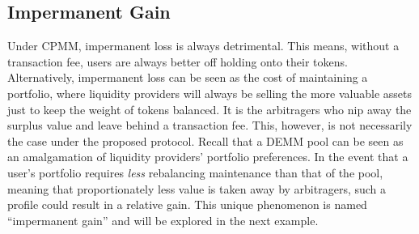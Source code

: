 \documentclass[12pt,a4paper]{article}
\begin{document}
\subsection{Impermanent Gain}

Under CPMM, impermanent loss is always detrimental. This means, without a transaction fee, users are always better off holding onto their tokens. Alternatively, impermanent loss can be seen as the cost of maintaining a portfolio, where liquidity providers will always be selling the more valuable assets just to keep the weight of tokens balanced. It is the arbitragers who nip away the surplus value and leave behind a transaction fee. This, however, is not necessarily the case under the proposed protocol. Recall that a DEMM pool can be seen as an amalgamation of liquidity providers' portfolio preferences. In the event that a user's portfolio requires \emph{less} rebalancing maintenance than that of the pool, meaning that proportionately less value is taken away by arbitragers, such a profile could result in a relative gain. This unique phenomenon is named ``impermanent gain'' and will be explored in the next example.
\end{document}
